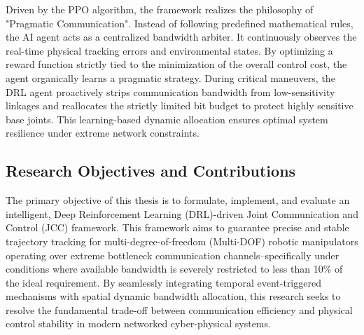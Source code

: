 Driven by the PPO algorithm, the framework realizes the philosophy of "Pragmatic Communication". Instead of following 
predefined mathematical rules, the AI agent acts as a centralized bandwidth arbiter. It continuously observes the real-time physical tracking errors and environmental states. 
By optimizing a reward function strictly tied to the minimization of the overall control cost, the agent organically learns a pragmatic strategy.
During critical maneuvers, the DRL agent proactively strips communication bandwidth from low-sensitivity linkages and reallocates the strictly limited bit budget to protect highly sensitive base joints. 
This learning-based dynamic allocation ensures optimal system resilience under extreme network constraints.
\subsection{Research Objectives and Contributions}
The primary objective of this thesis is to formulate, implement, and evaluate an intelligent, Deep Reinforcement Learning (DRL)-driven Joint Communication and Control (JCC) framework. 
This framework aims to guarantee precise and stable trajectory tracking for multi-degree-of-freedom (Multi-DOF) robotic manipulators operating over extreme bottleneck communication channels--specifically under conditions where available bandwidth is severely restricted to less than 10\% of the ideal requirement. 
By seamlessly integrating temporal event-triggered mechanisms with spatial dynamic bandwidth allocation, this research seeks to resolve the fundamental trade-off between communication efficiency and physical control stability in modern networked cyber-physical systems.

